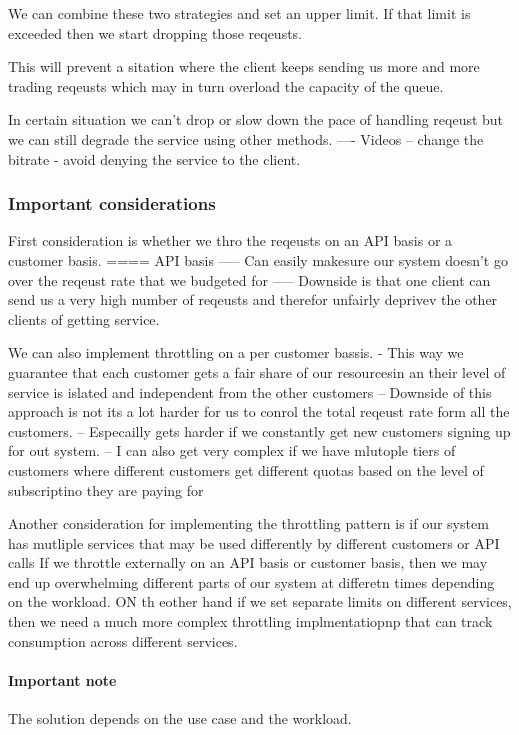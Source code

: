 \documentclass[a4paper, 11pt]{book}
\begin{document}
    We can combine these two strategies and set an upper limit.
    If that limit is exceeded then we start dropping those reqeusts.

    This will prevent a sitation where the client keeps sending us more and more trading reqeusts which may in turn overload the capacity of the queue.

    In certain situation we can't drop or slow down the pace of handling reqeust but we can still degrade the service using other methods.
    ---- Videos -- change the bitrate - avoid denying the service to the client.

    \subsubsection{Important considerations}
    First consideration is whether we thro the reqeusts on an API basis or a customer basis.
    ==== API basis
    ----- Can easily makesure our system doesn't go over the reqeust rate that we budgeted for
    ----- Downside is that one client can send us a very high number of reqeusts and therefor unfairly deprivev the other clients of getting service.

    We can also implement throttling on a per customer bassis.
    - This way we guarantee that each customer gets a fair share of our resourcesin an their level of service is islated and independent from the other customers
    -- Downside of this approach is not its a lot harder for us to conrol the total reqeust rate form all the customers.
    -- Especailly gets harder if we constantly get new customers signing up for out system.
    -- I can also get very complex if we have mlutople tiers of customers where different customers get different quotas based on the level of subscriptino they are paying for

    Another consideration for implementing the throttling pattern is if our system has mutliple services that may be used differently by different customers or API calls
    If we throttle externally on an API basis or customer basis, then we may end up overwhelming different parts of our system at differetn times depending on the workload.
    ON th eother hand if we set separate limits on different services, then we need a much more complex throttling implmentatiopnp that can track consumption across different services.

    \paragraph{Important note}
    The solution depends on the use case and the workload.
\end{document}
